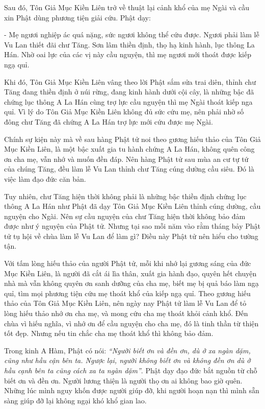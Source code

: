 \documentclass[
  12pt,
  oneside]{book}
\begin{document}
Sau đó, Tôn Giả Mục Kiền Liên trở về thuật lại cảnh khổ của mẹ Ngài và cầu xin Phật dùng phương tiện giải cứu. Phật dạy:

- Mẹ ngươi nghiệp ác quá nặng, sức ngươi không thể cứu được. Ngươi phải làm lễ Vu Lan thiết đãi chư Tăng. Sơn lâm thiền định, thọ hạ kinh hành, lục thông La Hán. Nhờ oai lực của các vị này cầu nguyện, thì mẹ ngươi mới thoát được kiếp ngạ quỉ.

Khi đó, Tôn Giả Mục Kiền Liên vâng theo lời Phật sắm sửa trai diên, thỉnh chư Tăng đang thiền định ở núi rừng, đang kinh hành dưới cội cây, là những bậc đã chứng lục thông A La Hán cùng trợ lực cầu nguyện thì mẹ Ngài thoát kiếp nga quỉ. Vì lý do Tôn Giả Mục Kiền Liên không đủ sức cứu mẹ, nên phải nhờ số đông chư Tăng đã chứng A La Hán trợ lực mới cứu được mẹ Ngài.

Chính sự kiện này mà về sau hàng Phật tử noi theo gương hiếu thảo của Tôn Giả Mục Kiền Liên, là một bậc xuất gia tu hành chứng A La Hán, không quên công ơn cha mẹ, vẫn nhớ và muốn đền đáp. Nên hàng Phật tử sau mùa an cư tự tứ của chúng Tăng, đều làm lễ Vu Lan thỉnh chư Tăng cúng dường cầu siêu. Đó là việc làm đạo đức căn bản.

Tuy nhiên, chư Tăng hiện thời không phải là những bậc thiền định chứng lục thông A La Hán như Phật đã dạy Tôn Giả Mục Kiền Liên thỉnh cúng dường, cầu nguyện cho Ngài. Nên sự cầu nguyện của chư Tăng hiện thời không bảo đảm được như ý nguyện của Phật tử. Nhưng tại sao mỗi năm vào rằm tháng bảy Phật tử tụ hội về chùa làm lễ Vu Lan để làm gì? Điều này Phật tử nên hiểu cho tường tận.

Với tấm lòng hiếu thảo của người Phật tử, mỗi khi nhớ lại gương sáng của đức Mục Kiền Liên, là người đã cắt ái lìa thân, xuất gia hành đạo, quyên hết chuyện nhà mà vẫn không quyên ơn sanh dưỡng của cha mẹ, biết mẹ bị quả báo làm ngạ quỉ, tìm mọi phương tiện cứu mẹ thoát khổ của kiếp ngạ quỉ. Theo gương hiếu thảo của Tôn Giả Mục Kiền Liên, nên ngày nay Phật tử làm lễ Vu Lan để tỏ lòng hiếu thảo nhớ ơn cha mẹ, và mong cứu cha mẹ thoát khỏi cảnh khổ. Đến chùa vì hiếu nghĩa, vì nhớ ơn để cầu nguyện cho cha mẹ, đó là tinh thần từ thiện tốt đẹp. Nhưng nếu tin chắc cha mẹ thoát khổ thì không bảo đảm.

Trong kinh A Hàm, Phật có nói: \emph{``Người biết ơn và đền ơn, dù ở xa ngàn dặm, cũng như hầu cận bên ta. Ngược lại, người không biết ơn và không đền ơn dù ở hầu cạnh bên ta cũng cách xa ta ngàn dặm''}. Phật dạy đạo đức bắt nguồn từ chỗ biết ơn và đền ơn. Người lương thiện là người thọ ơn ai không bao giờ quên. Những lúc mình nguy khốn được người giúp đỡ, khi người hoạn nạn thì mình sẵn sàng giúp đỡ lại không ngại khó khổ gian lao.
\end{document}
